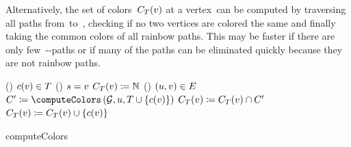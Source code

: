 Alternatively, the set of colors~$C_T(v)$ at a
vertex~\vertex can be computed by traversing all paths from~\source to~\vertex,
checking if no two vertices are colored the same and finally taking the common
colors of all rainbow paths. This may be faster if there are only
few~\source-\vertex-paths or if many of the paths can be eliminated quickly
because they are not rainbow paths.
% 
\begin{algorithm}[tb!]
    \SetAlgoLined

    \lIf()
        {$c(v)\in T$}%
    {%
        \Return{\naturals}
        \label{ch:switching:sec:exploit_structural_characteristics:alg:compute_colors:1}
    } %
    \lIf()
        {$s=v$}%
    {%
        \Return{$\{\col(\source)\}$}%
        \label{ch:switching:sec:exploit_structural_characteristics:alg:compute_colors:2}
    } %
    $C_T(v) \coloneq \mathbb{N}$\;
    \label{ch:switching:sec:exploit_structural_characteristics:alg:compute_colors:3}
    \For(){
        $(u,v)\in E$
    }{
        $C'\coloneqq\computeColors\left(\coloredgraph, \vertexa, 
        \forbidden\cup\{\col(\vertexb)\}\right)$
        \label{ch:switching:sec:exploit_structural_characteristics:alg:compute_colors:5}
        $C_T(v) \coloneqq 
        C_T(v) \cap C'$\;
        \label{ch:switching:sec:exploit_structural_characteristics:alg:compute_colors:6}
    } %
    $C_T(v) \coloneqq C_T
    (v) \cup \{c(v)\}$\;
    \label{ch:switching:sec:exploit_structural_characteristics:alg:compute_colors:8}
    \;
    \label{ch:switching:sec:exploit_structural_characteristics:alg:compute_colors:9}
    \caption{computeColors}
    \label{ch:switching:sec:exploit_structural_characteristics:alg:compute_colors}
\end{algorithm}
% 
